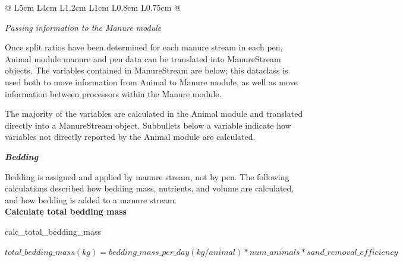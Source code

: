 \begin{refsection}
\begin{table}[h!]
\begin{tabular}{@{} L{5cm} L{4cm} L{1.2cm} L{1cm} L{0.8cm} L{0.75cm} @{}}
\bottomrule
{} \\


\end{tabular}
\end{table}




\textit{Passing information to the Manure module}
\vspace{0.1cm}

Once split ratios have been determined for each manure stream in each pen, Animal module manure and pen data can be translated into ManureStream objects. The variables contained in ManureStream are below; this dataclass is used both to move information from Animal to Manure module, as well as move information between processors within the Manure module. 


The majority of the variables are calculated in the Animal module and translated directly into a ManureStream object. Subbullets below a variable indicate how variables not directly reported by the Animal module are calculated. 
\vspace{0.2cm}

\textbf{\textit{Bedding}}
\vspace{0.25cm}

Bedding is assigned and applied by manure stream, not by pen. The following calculations described how bedding mass, nutrients, and volume are calculated, and how bedding is added to a manure stream.\\

\textbf{Calculate total bedding mass}
\vspace{ 0.25cm}

calc\_total\_bedding\_mass

\vspace{0.2cm}

    \begin{center}
        \(total\_bedding\_mass (kg) = bedding\_mass\_per\_day (kg/animal) * num\_animals * sand\_removal\_efficiency \)
    \end{center}
        \vspace{0.5cm}
    

\end{refsection}
